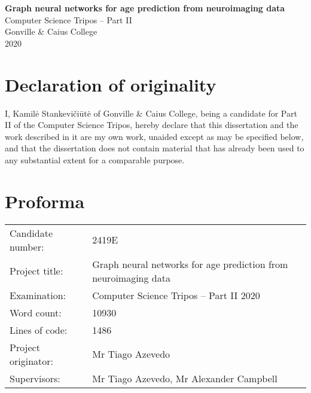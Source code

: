 \pagestyle{empty}
\thispagestyle{empty}


\vspace*{60mm}
\begin{center}
\Large
\textbf{Graph neural networks for age prediction from neuroimaging data} \\[5mm]
\large
Computer Science Tripos -- Part II \\[5mm]
Gonville \& Caius College \\[5mm]
2020
\end{center}


\pagestyle{plain}
\newpage
\chapter*{Declaration of originality}

I, Kamilė Stankevičiūtė of Gonville \& Caius College, being a candidate for Part II of the Computer Science Tripos, hereby declare that this dissertation and the work described in it are my own work, unaided except as may be specified below, and that the dissertation does not contain material that has already been used to any substantial extent for a comparable purpose.

\bigskip
{}

\medskip
{}

\chapter*{Proforma}

\begin{tabular}{ll}
Candidate number:   & 2419E                  \\
Project title:      & Graph neural networks for age prediction from neuroimaging data \\
Examination:        & Computer Science Tripos -- Part II 2020 \\
Word count:         & 10930\footnotemark[1] \\
Lines of code:      & 1486  \\
Project originator: & Mr Tiago Azevedo                        \\
Supervisors:        & Mr Tiago Azevedo, Mr Alexander Campbell \\ 
\end{tabular}

